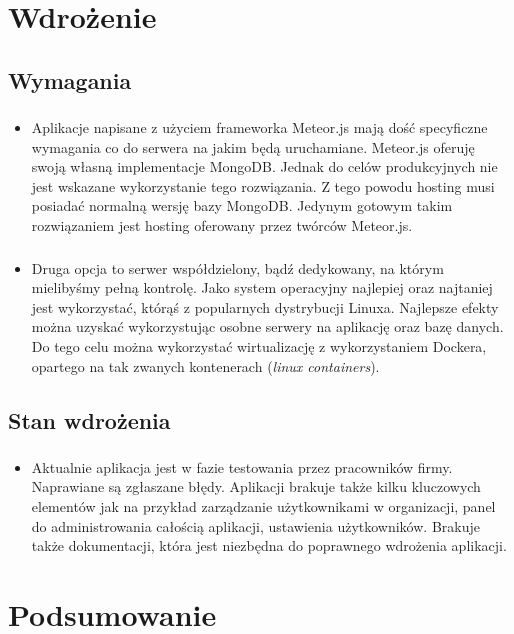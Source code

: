 \documentclass{beamer}
\newenvironment{justbe}%
{\setlength{\leftmargini}{0pt}\begin{itemize}\item[]}%
{\end{itemize}}
\begin{document}
\section{Wdrożenie}
\subsection{Wymagania}
\begin{frame}
 \frametitle{}
 \begin{justbe}
  Aplikacje napisane z użyciem frameworka Meteor.js mają dość specyficzne wymagania co do serwera na jakim będą uruchamiane. Meteor.js oferuję swoją własną implementacje MongoDB. Jednak do celów produkcyjnych nie jest wskazane wykorzystanie tego rozwiązania. Z tego powodu hosting musi posiadać normalną wersję bazy MongoDB. Jedynym gotowym takim rozwiązaniem jest hosting oferowany przez twórców Meteor.js. 
 \end{justbe}
\end{frame}

\begin{frame}
 \frametitle{}
 \begin{justbe}
  Druga opcja to serwer współdzielony, bądź dedykowany, na którym mielibyśmy pełną kontrolę. Jako system operacyjny najlepiej oraz najtaniej jest wykorzystać, którąś z popularnych dystrybucji Linuxa. Najlepsze efekty można uzyskać wykorzystując osobne serwery na aplikację oraz bazę danych. Do tego celu można wykorzystać wirtualizację z wykorzystaniem Dockera, opartego na tak zwanych kontenerach (\textit{linux containers}).
 \end{justbe}
\end{frame}

\subsection{Stan wdrożenia}
\begin{frame}
 \frametitle{}
 \begin{justbe}
  Aktualnie aplikacja jest w fazie testowania przez pracowników firmy. Naprawiane są zgłaszane błędy. Aplikacji brakuje także kilku kluczowych elementów jak na przykład zarządzanie użytkownikami w organizacji, panel do administrowania całością aplikacji, ustawienia użytkowników. Brakuje także dokumentacji, która jest niezbędna do poprawnego wdrożenia aplikacji.
 \end{justbe}
\end{frame}


\section{Podsumowanie}
\end{document}
